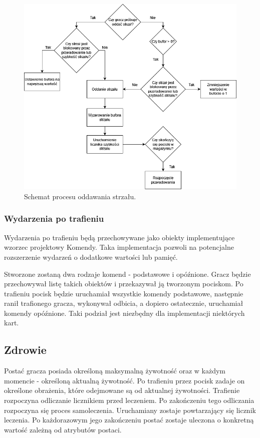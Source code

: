 \begin{figure}
    \centering
    \includegraphics[width=.8\linewidth]{Images/design/ShootFlowchart(1).png}
    \caption{Schemat procesu oddawania strzału.}
    \label{fig:shoot_flowchart}
\end{figure}

\subsubsection*{Wydarzenia po trafieniu}
Wydarzenia po trafieniu będą przechowywane jako obiekty implementujące wzorzec projektowy Komendy\cite{game_programming_patterns}. Taka implementacja pozwoli na potencjalne rozszerzenie wydarzeń o dodatkowe wartości lub pamięć. 

Stworzone zostaną dwa rodzaje komend - podstawowe i opóźnione. Gracz będzie przechowywał listę takich obiektów i przekazywał ją tworzonym pociskom. Po trafieniu pocisk będzie uruchamiał wszystkie komendy podstawowe, następnie ranił trafionego gracza, wykonywał odbicia, a dopiero ostatecznie, uruchamiał komendy opóźnione. Taki podział jest niezbędny dla implementacji niektórych kart.

\subsection{Zdrowie}
Postać gracza posiada określoną maksymalną żywotność oraz w każdym momencie - określoną aktualną żywotność. Po trafieniu przez pocisk zadaje on określone obrażenia, które odejmowane są od aktualnej żywotności. Trafienie rozpoczyna odliczanie licznikiem przed leczeniem. Po zakończeniu tego odliczania rozpoczyna się proces samoleczenia. Uruchamiany zostaje powtarzający się licznik leczenia. Po każdorazowym jego zakończeniu postać zostaje uleczona o konkretną wartość zależną od atrybutów postaci.

